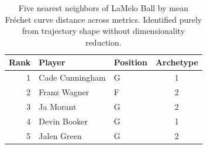 \begin{table}[htbp]
  \centering\small
  \begin{tabular}{rllc}
    \toprule
    Rank & Player & Position & Archetype \\
    \midrule
    1 & Cade Cunningham & G & 1 \\
    2 & Franz Wagner & F & 2 \\
    3 & Ja Morant & G & 2 \\
    4 & Devin Booker & G & 1 \\
    5 & Jalen Green & G & 2 \\
    \bottomrule
  \end{tabular}
  \caption{Five nearest neighbors of LaMelo Ball by mean Fr\'{e}chet curve distance across metrics. Identified purely from trajectory shape without dimensionality reduction.}
  \label{tab:LaMelo_Ball_frechet_curve_neighbors}
\end{table}

